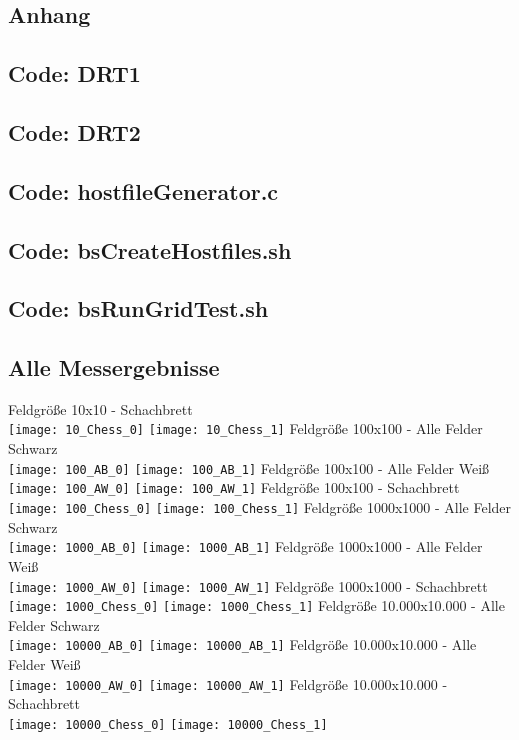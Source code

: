 \documentclass[
10pt, %
a4paper, %
oneside, %
headinclude,footinclude, %
BCOR5mm, %
]{scrartcl}
\begin{document}
\begin{appendix} 
	\clearpage 
	\section{Anhang}
	\subsection{Code: DRT1}
	\subsection{Code: DRT2}
	\subsection{Code: hostfileGenerator.c}
	\subsection{Code: bsCreateHostfiles.sh}			
	\subsection{Code: bsRunGridTest.sh}
	\subsection{Alle Messergebnisse}

	Feldgröße 10x10 - Schachbrett\\
	\texttt{[image: 10\_Chess\_0]} 
	\texttt{[image: 10\_Chess\_1]} 
	Feldgröße 100x100 - Alle Felder Schwarz\\
	\texttt{[image: 100\_AB\_0]} 
	\texttt{[image: 100\_AB\_1]} 
	Feldgröße 100x100 - Alle Felder Weiß\\
	\texttt{[image: 100\_AW\_0]} 
	\texttt{[image: 100\_AW\_1]} 
	Feldgröße 100x100 - Schachbrett\\
	\texttt{[image: 100\_Chess\_0]} 
	\texttt{[image: 100\_Chess\_1]} 
	Feldgröße 1000x1000 - Alle Felder Schwarz\\
	\texttt{[image: 1000\_AB\_0]} 
	\texttt{[image: 1000\_AB\_1]} 
	Feldgröße 1000x1000 - Alle Felder Weiß\\
	\texttt{[image: 1000\_AW\_0]} 
	\texttt{[image: 1000\_AW\_1]} 
	Feldgröße 1000x1000 - Schachbrett\\
	\texttt{[image: 1000\_Chess\_0]} 
	\texttt{[image: 1000\_Chess\_1]} 
	Feldgröße 10.000x10.000 - Alle Felder Schwarz\\
	\texttt{[image: 10000\_AB\_0]} 
	\texttt{[image: 10000\_AB\_1]} 
	Feldgröße 10.000x10.000 - Alle Felder Weiß\\
	\texttt{[image: 10000\_AW\_0]} 
	\texttt{[image: 10000\_AW\_1]} 
	Feldgröße 10.000x10.000 - Schachbrett\\
	\texttt{[image: 10000\_Chess\_0]} 
	\texttt{[image: 10000\_Chess\_1]} 
	

\end{appendix}
\end{document}
